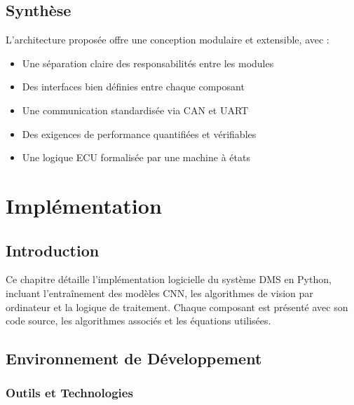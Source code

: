 \documentclass[12pt,a4paper,twoside]{report}
\begin{document}
\section{Synthèse}

L'architecture proposée offre une conception modulaire et extensible, avec :
\begin{itemize}
    \item Une séparation claire des responsabilités entre les modules
    \item Des interfaces bien définies entre chaque composant
    \item Une communication standardisée via CAN et UART
    \item Des exigences de performance quantifiées et vérifiables
    \item Une logique ECU formalisée par une machine à états
\end{itemize}


\chapter{Implémentation}

\section{Introduction}

Ce chapitre détaille l'implémentation logicielle du système DMS en Python, incluant l'entraînement des modèles CNN, les algorithmes de vision par ordinateur et la logique de traitement. Chaque composant est présenté avec son code source, les algorithmes associés et les équations utilisées.

\section{Environnement de Développement}

\subsection{Outils et Technologies}
\end{document}
